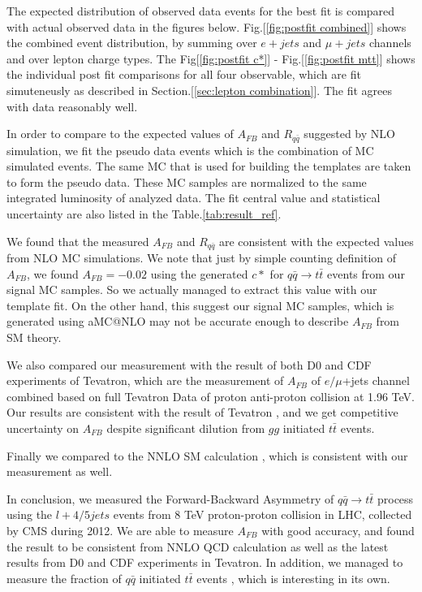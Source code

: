 The expected distribution of observed data events for the best fit is compared with actual observed data in the figures below. Fig.[\ref{fig:postfit combined}] shows the combined event distribution, by summing over $e+jets$ and $\mu+jets$ channels and over lepton charge types. The Fig[\ref{fig:postfit c*}] - Fig.[\ref{fig:postfit mtt}] shows the individual post fit comparisons for all four observable, which are fit simuteneusly as described in Section.[\ref{sec:lepton combination}]. The fit agrees with data reasonably well. 

In order to compare to the expected values of $A_{FB}$ and $R_{q\bar{q}}$ suggested by NLO simulation, we fit the pseudo data events which is the combination of MC simulated events. The same MC that is used for building the templates are taken to form the pseudo data. These MC samples are normalized to the same integrated luminosity of analyzed data. The fit central value and statistical uncertainty are also listed in the Table.\ref{tab:result_ref}.

We found that the measured $A_{FB}$ and $R_{q\bar{q}}$ are consistent with the expected values from NLO MC simulations. We note that just by simple counting definition of $A_{FB}$, we found $A_{FB}=-0.02$ using the generated $c*$ for $q\bar{q}\rightarrow t\bar t$ events from our signal MC samples. So we actually managed to extract this value with our template fit. On the other hand, this suggest our signal MC samples, which is generated using aMC@NLO may not be accurate enough to describe $A_{FB}$ from SM theory.

We also compared our measurement with the result of both D0 and CDF experiments of Tevatron, which are the measurement of $A_{FB}$ of $e/\mu$+jets channel combined based on full Tevatron Data of proton anti-proton collision at 1.96 TeV. Our results are consistent with the result of Tevatron \cite{d0,CDF2016}, and we get competitive uncertainty on $A_{FB}$ despite significant dilution from $gg$ initiated $t\bar{t}$ events. 

Finally we compared to the NNLO SM calculation \cite{Czakon:2014xsa}, which is consistent with our measurement as well. 

In conclusion, we measured the Forward-Backward Asymmetry of $q\bar q\rightarrow t\bar t$ process using the $l+4/5jets$ events from 8 TeV proton-proton collision in LHC, collected by CMS during 2012. We are able to measure $A_{FB}$ with good accuracy, and found the result to be consistent from NNLO QCD calculation as well as the latest results from D0 and CDF experiments in Tevatron. In addition, we managed to measure the fraction of $q\bar{q}$ initiated $t\bar{t}$ events , which is interesting in its own.



